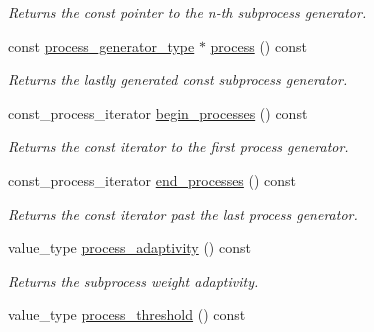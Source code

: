 \begin{DoxyCompactItemize}
\begin{DoxyCompactList}\small\item\em Returns the const pointer to the n-\/th subprocess generator. \end{DoxyCompactList}\item 
\hypertarget{a00210_af4976d6c9b846daf993c28a01c3ad32c}{const \hyperlink{a00430}{process\-\_\-generator\-\_\-type} $\ast$ \hyperlink{a00210_af4976d6c9b846daf993c28a01c3ad32c}{process} () const }\label{a00210_af4976d6c9b846daf993c28a01c3ad32c}

\begin{DoxyCompactList}\small\item\em Returns the lastly generated const subprocess generator. \end{DoxyCompactList}\item 
\hypertarget{a00210_a971bcc180427c97b86c065a52a5a3f6b}{const\-\_\-process\-\_\-iterator \hyperlink{a00210_a971bcc180427c97b86c065a52a5a3f6b}{begin\-\_\-processes} () const }\label{a00210_a971bcc180427c97b86c065a52a5a3f6b}

\begin{DoxyCompactList}\small\item\em Returns the const iterator to the first process generator. \end{DoxyCompactList}\item 
\hypertarget{a00210_a43676ce551f831ea4df4259cfcff05c4}{const\-\_\-process\-\_\-iterator \hyperlink{a00210_a43676ce551f831ea4df4259cfcff05c4}{end\-\_\-processes} () const }\label{a00210_a43676ce551f831ea4df4259cfcff05c4}

\begin{DoxyCompactList}\small\item\em Returns the const iterator past the last process generator. \end{DoxyCompactList}\item 
\hypertarget{a00210_a02284885861a310068368c3a67bc8453}{value\-\_\-type \hyperlink{a00210_a02284885861a310068368c3a67bc8453}{process\-\_\-adaptivity} () const }\label{a00210_a02284885861a310068368c3a67bc8453}

\begin{DoxyCompactList}\small\item\em Returns the subprocess weight adaptivity. \end{DoxyCompactList}\item 
\hypertarget{a00210_ab416c9758e0eb56d9f44c577807fca54}{value\-\_\-type \hyperlink{a00210_ab416c9758e0eb56d9f44c577807fca54}{process\-\_\-threshold} () const }\label{a00210_ab416c9758e0eb56d9f44c577807fca54}


\end{DoxyCompactItemize}
